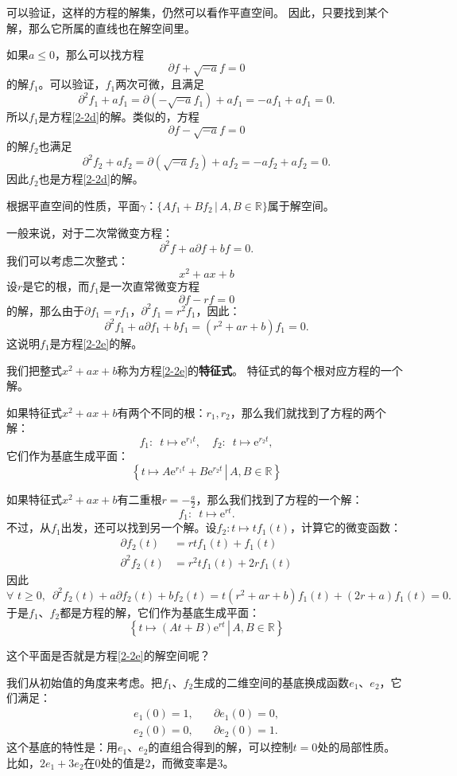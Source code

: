 \documentclass[12pt,UTF8]{ctexbook}
\newcommand{\e}{\mathrm{e}}
\theoremstyle{definition}
\theoremstyle{plain}
\begin{document}
可以验证，这样的方程的解集，仍然可以看作平直空间。
因此，只要找到某个解，那么它所属的直线也在解空间里。

如果$a\leqslant 0$，那么可以找方程
$$ \partial f + \sqrt{-a} f = 0 $$
的解$f_1$。可以验证，$f_1$两次可微，且满足
$$ \partial^2 f_1 + a f_1 = \partial (- \sqrt{-a} f_1) + af_1 = -af_1 + af_1 = 0. $$
所以$f_1$是方程\eqref{2-2d}的解。类似的，方程
$$ \partial f - \sqrt{-a} f = 0 $$
的解$f_2$也满足
$$ \partial^2 f_2 + a f_2 = \partial (\sqrt{-a} f_2) + af_2 = -af_2 + af_2 = 0. $$
因此$f_2$也是方程\eqref{2-2d}的解。

根据平直空间的性质，平面$\gamma$：$\{Af_1 + Bf_2 \, | \, A, B\in\mathbb{R}\}$属于解空间。

一般来说，对于二次常微变方程：
\begin{equation}
    \partial^2 f + a \partial f + b f = 0. \label{2-2e}
\end{equation}
我们可以考虑二次整式：
$$ x^2 + ax + b$$
设$r$是它的根，而$f_1$是一次直常微变方程
$$ \partial f - r f = 0 $$
的解，那么由于$\partial f_1 = rf_1 $，$\partial^2 f_1 = r^2f_1 $，因此：
$$ \partial^2 f_1 + a \partial f_1 + b f_1 = (r^2 + ar + b)f_1 = 0.$$
这说明$f_1$是方程\eqref{2-2e}的解。

我们把整式$ x^2 + ax + b$称为方程\eqref{2-2e}的\textbf{特征式}。
特征式的每个根对应方程的一个解。

如果特征式$x^2 + ax + b$有两个不同的根：$r_1, r_2$，那么我们就找到了方程的两个解：
$$ f_1:\,\,\, t \mapsto \e^{r_1t}, \quad f_2:\,\,\, t \mapsto \e^{r_2t}, $$
它们作为基底生成平面：
$$ \left\{\left.t \mapsto A\e^{r_1t} + B\e^{r_2t}\,\right|\, A, B \in \mathbb{R}\right\}$$

如果特征式$x^2 + ax + b$有二重根$r = -\frac{a}{2}$，那么我们找到了方程的一个解：
$$ f_1:\,\,\, t \mapsto \e^{rt}. $$
不过，从$f_1$出发，还可以找到另一个解。设$f_2: t\mapsto tf_1(t)$，计算它的微变函数：
\begin{align*}
    \partial f_2(t) &= rt f_1(t) + f_1(t) \\
    \partial^2 f_2(t) &= r^2 t f_1(t) + 2r f_1(t)
\end{align*}
因此
$$ \forall\,\, t \geqslant 0,\,\,\,\partial^2 f_2(t) + a \partial f_2(t) + b f_2(t) = t(r^2 + ar + b)f_1(t) + (2r + a)f_1(t) = 0.$$
于是$f_1$、$f_2$都是方程的解，它们作为基底生成平面：
$$ \left\{\left.t \mapsto (At + B)\e^{rt}\,\right|\, A, B \in \mathbb{R}\right\}$$

这个平面是否就是方程\eqref{2-2e}的解空间呢？

我们从初始值的角度来考虑。把$f_1$、$f_2$生成的二维空间的基底换成函数$e_1$、$e_2$，它们满足：
$$
\begin{array}{ll}
    e_1(0) = 1, &\quad \partial e_1(0) = 0, \\
    e_2(0) = 0, &\quad \partial e_2(0) = 1.
\end{array}
$$
这个基底的特性是：用$e_1$、$e_2$的直组合得到的解，可以控制$t = 0$处的局部性质。
比如，$2e_1 + 3e_2$在$0$处的值是$2$，而微变率是$3$。
\end{document}
